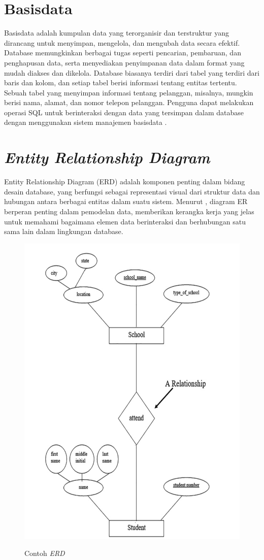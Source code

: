 \section{Basisdata}
Basisdata adalah kumpulan data yang terorganisir dan terstruktur yang dirancang untuk menyimpan, mengelola, dan mengubah data secara efektif. Database memungkinkan berbagai tugas seperti pencarian, pembaruan, dan penghapusan data, serta menyediakan penyimpanan data dalam format yang mudah diakses dan dikelola. Database biasanya terdiri dari tabel yang terdiri dari baris dan kolom, dan setiap tabel berisi informasi tentang entitas tertentu. Sebuah tabel yang menyimpan informasi tentang pelanggan, misalnya, mungkin berisi nama, alamat, dan nomor telepon pelanggan. Pengguna dapat melakukan operasi SQL untuk berinteraksi dengan data yang tersimpan dalam database dengan menggunakan sistem manajemen basisdata \citep{santoso2021sql}.

\section{\textit{Entity Relationship Diagram}}
Entity Relationship Diagram (ERD) adalah komponen penting dalam bidang desain database, yang berfungsi sebagai representasi visual dari struktur data dan hubungan antara berbagai entitas dalam suatu sistem. Menurut \citet{bagui2023database}, diagram ER berperan penting dalam pemodelan data, memberikan kerangka kerja yang jelas untuk memahami bagaimana elemen data berinteraksi dan berhubungan satu sama lain dalam lingkungan database.

\begin{figure}[htbp]
  \centering
  \includegraphics[width=0.85\linewidth]{images/bab-2/erd-example.png}
  \caption{Contoh \emph{ERD}}\label{fig:erd-example}\citep{bagui2023database}
\end{figure}

